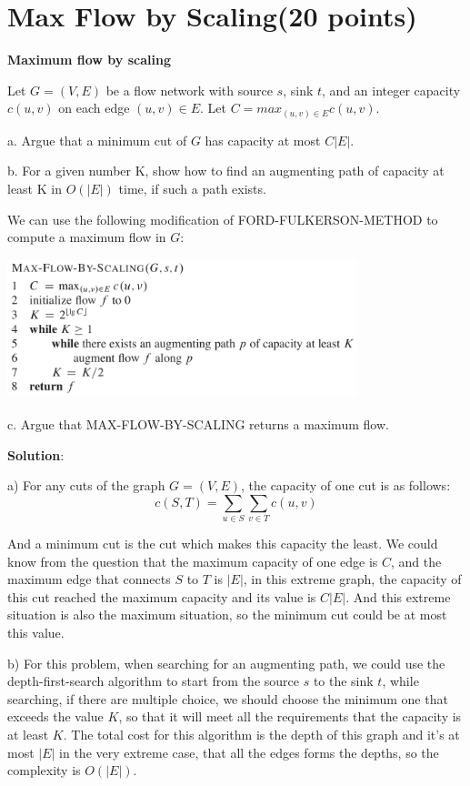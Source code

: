 \documentclass{article}
\begin{document}
\section{Max Flow by Scaling(20 points)}
\textbf{Maximum flow by scaling}

Let $G=(V, E)$ be a flow network with source $s$, sink $t$, and an integer capacity $c(u, v)$ on each edge $(u, v)\in{E}$. Let $C=max_{(u,v)\in{E}}c(u,v)$.

a. Argue that a minimum cut of $G$ has capacity at most $C|E|$.

b. For a given number K, show how to find an augmenting path of capacity at least K in $O(|E|)$ time, if such a path exists.

We can use the following modification of FORD-FULKERSON-METHOD to compute a maximum flow in $G$:

\begin{center} %
\includegraphics[width=4.00in,height=1.60in]{hw5_1.png}
\end{center}


c. Argue that MAX-FLOW-BY-SCALING returns a maximum flow.\newline

\textbf{Solution}:

a) For any cuts of the graph $G=(V, E)$, the capacity of one cut is as follows:
$$c(S, T) = \sum_{u\in{S}}\sum_{v\in{T}}c(u, v)$$

And a minimum cut is the cut which makes this capacity the least. We could know from the question that the maximum 
capacity of one edge is $C$, and the maximum edge that connects $S$ to $T$ is $|E|$, in this extreme graph, the capacity
of this cut reached the maximum capacity and its value is $C|E|$. And this extreme situation is also the maximum situation, so the minimum cut could be at most this value.

b) For this problem, when searching for an augmenting path, we could use the depth-first-search algorithm to start from
the source $s$ to the sink $t$, while searching, if there are multiple choice, we should choose the minimum one that exceeds the value $K$, so that it will meet all the requirements that the capacity is at least $K$. The total cost for this algorithm is the depth of this graph and it's at most $|E|$ in the very extreme case, that all the edges forms the
depths, so the complexity is $O(|E|)$.
\end{document}
